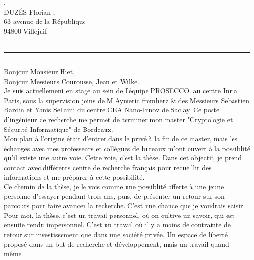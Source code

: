 \begin{large}


\hfill \entreprise, \\
DUZÉS Florian  \hfill \adresse,\\
63 avenue de la République\hfill \adresseVille \\
94800 Villejuif \\
\phonenumber \\
\mail

\medbreak\medbreak

 
   
\vspace{8pt}
{\color{accentLine} \hrule}
\begin{center}
    {\Large\color{accentTitle} \stagename}
\end{center}
{\color{accentLine} \hrule}
\vspace{8pt}


\begin{justify}
\hspace{15pt}Bonjour Monsieur Hiet,\\

Bonjour Messieurs Courousse, Jean et Wilke.\\

Je suis actuellement en stage au sein de l'équipe PROSECCO, au centre Inria
Paris, sous la supervision joins de M.Aymeric fromherz \& des Messieurs Sebastien
Bardin et Yanis Sellami du centre CEA Nano-Innov de Saclay. Ce poste d'ingénieur de recherche me permet
de terminer mon master "Cryptologie et Sécurité Informatique" de Bordeaux.\\

Mon plan à l'origine était d'entrer dans le privé à la fin de ce master, mais les échanges avec mes professeurs et collègues de bureaux m'ont ouvert à la
possiblité qu'il existe une autre voie. Cette voie, c'est la thèse. Dans cet objectif, je prend contact avec différents centre de recherche français pour
recueillir des informations et me préparer à cette possibilité.\\

Ce chemin de la thèse, je le vois comme une possiblité offerte à une jeune personne d'essayer pendant trois ans, puis, de présenter un retour sur son
parcours pour faire avancer la recherche. C'est une chance que je voudrais saisir. Pour moi, la thèse, c'est un travail personnel, où on cultive un 
savoir, qui est ensuite rendu impersonnel. C'est un travail où il y a moins de contrainte de retour sur investissement que dans une société privée.
Un espace de liberté proposé dans un but de recherche et développement, mais un travail quand même.\\



\end{justify}
\end{large}

